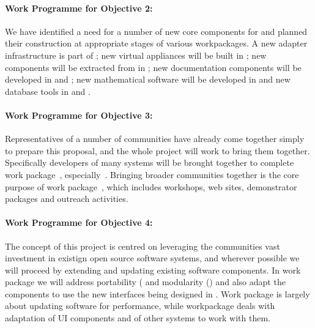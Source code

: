 \paragraph{Work Programme for Objective 2: }

We have identified a need for a number of new core components for
\TheProject and planned their construction at appropriate stages of
various workpackages. A new adapter infrastructure is part of
; new virtual
appliances will be built in
; new components will be
extracted from \SMC in  ;
new documentation components will be developed in
 and ; new
mathematical software will be developed in 
and new database tools in  and .


\paragraph{Work Programme for Objective 3: }

Representatives of a number of communities have already come together
simply to prepare this proposal, and the whole project will work to
bring them together. Specifically developers of many systems  will be brought together to complete
work package~,
especially~.
Bringing broader communities together is the core purpose of
work package~, which includes workshops, web sites,
demonstrator packages and outreach activities.

\paragraph{Work Programme for Objective 4: }

The concept of this project is centred on leveraging the communities
vast investment in existign open source software systems, and wherever
possible we will proceed by extending and updating existing software components.
In work package  we will address
portability ( and
modularity () and also
adapt the components to use the new interfaces being designed in
. Work package
 is largely about updating software for performance, while
workpackage  deals with adaptation of UI components and of
other systems to work with them.

